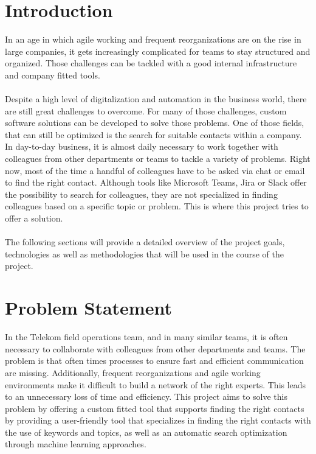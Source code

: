 \newpage
\section{Introduction}
In an age in which agile working and frequent reorganizations are on the rise 
in large companies, it gets increasingly complicated for teams to stay structured 
and organized. Those challenges can be tackled with a good internal infrastructure 
and company fitted tools.
\\
\\
Despite a high level of digitalization and automation in the business world, there are still 
great challenges to overcome. For many of those challenges, custom software solutions can 
be developed to solve those problems. One of those fields, that can still be optimized is 
the search for suitable contacts within a company. In day-to-day business, it is almost 
daily necessary to work together with colleagues from other departments or teams to tackle 
a variety of problems. Right now, most of the time a handful of colleagues have to be asked
via chat or email to find the right contact. Although tools like Microsoft Teams, Jira or 
Slack offer the possibility to search for colleagues, they are not specialized in finding colleagues
based on a specific topic or problem. This is where this project tries to offer a solution.\\
\\
The following sections will provide a detailed overview of the project goals, technologies as 
well as methodologies that will be used in the course of the project.

\section{Problem Statement}
In the Telekom field operations team, and in many similar teams, it is often necessary to collaborate
with colleagues from other departments and teams. The problem is that often times processes to ensure 
fast and efficient communication are missing. Additionally, frequent reorganizations and agile working 
environments make it difficult to build a network of the right experts. This leads to an unnecessary
loss of time and efficiency. This project aims to solve this problem by offering a custom fitted tool
that supports finding the right contacts by providing a user-friendly tool that specializes in finding 
the right contacts with the use of keywords and topics, as well as an automatic search optimization through
machine learning approaches.

